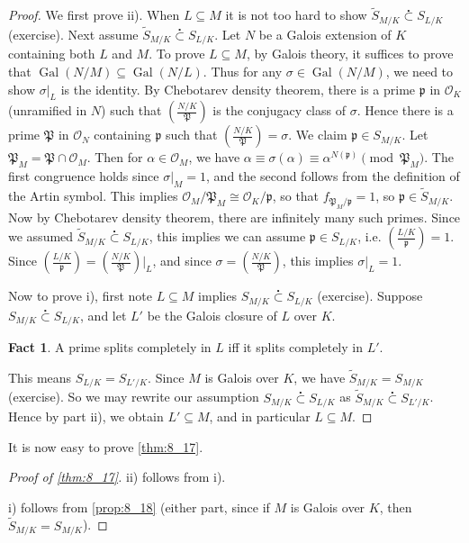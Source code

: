 \documentclass[11pt]{article}
\theoremstyle{definition}
\newtheorem*{fact}{Fact}
\theoremstyle{plain}
\theoremstyle{remark}
\DeclareMathOperator{\Gal}{Gal}
\newcommand{\cO}{\mathcal{O}}
\newcommand{\cp}{\mathfrak{P}}
\newcommand{\fp}{\mathfrak{p}}
\newcommand{\leg}[2]{\left(\frac{#1}{#2}\right)}
\newcommand{\subsetdot}{\stackrel{\centerdot}{\subset}}
\begin{document}
\begin{proof}
    We first prove ii). When $L \subseteq M$ it is not too hard to show $\widetilde{S}_{M/K} \subsetdot S_{L/K}$ (exercise). Next assume $\widetilde{S}_{M/K} \subsetdot S_{L/K}$. Let $N$ be a Galois extension of $K$ containing both $L$ and $M$. To prove $L \subseteq M$, by Galois theory, it suffices to prove that $\Gal(N/M) \subseteq \Gal(N/L)$. Thus for any $\sigma \in \Gal(N/M)$, we need to show $\sigma \vert_L$ is the identity. By Chebotarev density theorem, there is a prime $\fp$ in $\cO_K$ (unramified in $N$) such that $\leg{N/K}{\cp}$ is the conjugacy class of $\sigma$. Hence there is a prime $\cp$ in $\cO_N$ containing $\fp$ such that $\leg{N/K}{\cp} = \sigma$. We claim $\fp \in S_{M/K}$. Let $\cp_M = \cp \cap \cO_M$. Then for $\alpha \in \cO_M$, we have $\alpha \equiv \sigma(\alpha) \equiv \alpha^{N(\fp)} \pmod{\cp_M}$. The first congruence holds since $\sigma \vert_M = 1$, and the second follows from the definition of the Artin symbol. This implies $\cO_M / \cp_M \cong \cO_K / \fp$, so that $f_{\cp_M / \fp} = 1$, so $\fp \in \widetilde{S}_{M/K}$. Now by Chebotarev density theorem, there are infinitely many such primes. Since we assumed $\widetilde{S}_{M/K} \subsetdot S_{L/K}$, this implies we can assume $\fp \in S_{L/K}$, i.e. $\leg{L/K}{\fp} = 1$. Since $\leg{L/K}{\fp} = \leg{N/K}{\cp} \vert_L$, and since $\sigma = \leg{N/K}{\cp}$, this implies $\sigma \vert_L = 1$.

    Now to prove i), first note $L \subseteq M$ implies $S_{M/K} \subsetdot S_{L/K}$ (exercise). Suppose $S_{M/K} \subsetdot S_{L/K}$, and let $L'$ be the Galois closure of $L$ over $K$.
    \begin{fact}
        A prime splits completely in $L$ iff it splits completely in $L'$.
    \end{fact}
    This means $S_{L/K} = S_{L'/K}$. Since $M$ is Galois over $K$, we have $\widetilde{S}_{M/K} = S_{M/K}$ (exercise). So we may rewrite our assumption $S_{M/K} \subsetdot S_{L/K}$ as $\widetilde{S}_{M/K} \subsetdot S_{L'/K}$. Hence by part ii), we obtain $L' \subseteq M$, and in particular $L \subseteq M$.
\end{proof}

It is now easy to prove \autoref{thm:8_17}.
\begin{proof}[Proof of \autoref{thm:8_17}]
    ii) follows from i).

    i) follows from \autoref{prop:8_18} (either part, since if $M$ is Galois over $K$, then $\widetilde{S}_{M/K} = S_{M/K}$).
\end{proof}
\end{document}

